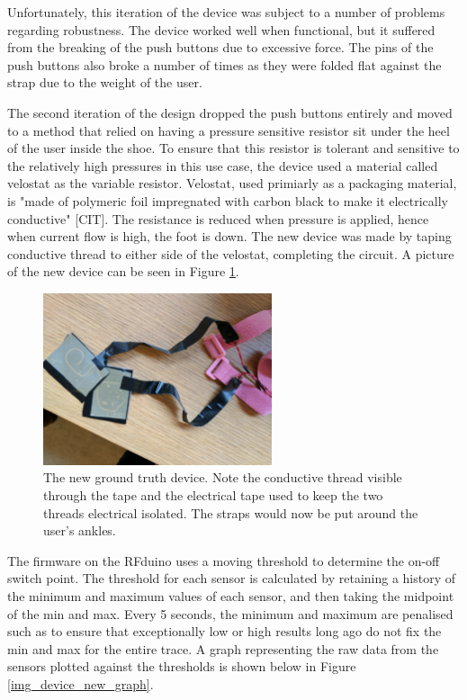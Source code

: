             Unfortunately, this iteration of the device was subject to a number of problems regarding robustness. The device worked well when functional, but it suffered from the breaking of the push buttons due to excessive force. The pins of the push buttons also broke a number of times as they were folded flat against the strap due to the weight of the user.

            The second iteration of the design dropped the push buttons entirely and moved to a method that relied on having a pressure sensitive resistor sit under the heel of the user inside the shoe. To ensure that this resistor is tolerant and sensitive to the relatively high pressures in this use case, the device used a material called velostat as the variable resistor. Velostat, used primiarly as a packaging material, is "made of polymeric foil impregnated with carbon black to make it electrically conductive" [CIT]. The resistance is reduced when pressure is applied, hence when current flow is high, the foot is down. The new device was made by taping conductive thread to either side of the velostat, completing the circuit. A picture of the new device can be seen in Figure \ref{img_device_new}.

            \begin{figure}[!th]
                \includegraphics[width=0.6\textwidth]{Images/device_new.jpg}
                \centering
                \caption{The new ground truth device. Note the conductive thread visible through the tape and the electrical tape used to keep the two threads electrical isolated. The straps would now be put around the user's ankles.}
                \label{img_device_new}
            \end{figure}

            The firmware on the RFduino uses a moving threshold to determine the on-off switch point. The threshold for each sensor is calculated by retaining a history of the minimum and maximum values of each sensor, and then taking the midpoint of the min and max. Every 5 seconds, the minimum and maximum are penalised such as to ensure that exceptionally low or high results long ago do not fix the min and max for the entire trace. A graph representing the raw data from the sensors plotted against the thresholds is shown below in Figure \ref{img_device_new_graph}.

